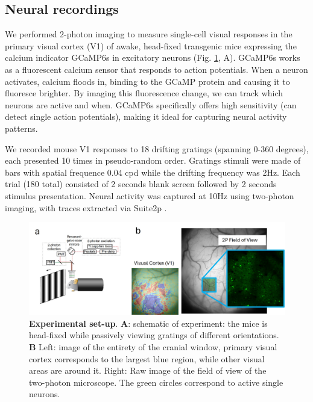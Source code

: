 \documentclass[11pt,a4paper]{article}
\begin{document}
\subsection{Neural recordings}

We performed 2-photon imaging to measure single-cell visual responses in the primary visual cortex (V1) of awake, head-fixed transgenic mice expressing the calcium indicator GCaMP6s in excitatory neurons (Fig. \ref{fig:technique.jpg}, A). GCaMP6s works as a fluorescent calcium sensor that responds to action potentials. When a neuron activates, calcium floods in, binding to the GCaMP protein and causing it to fluoresce brighter. By imaging this fluorescence change, we can track which neurons are active and when. GCaMP6s specifically offers high sensitivity (can detect single action potentials), making it ideal for capturing neural activity patterns. 

We recorded mouse V1 responses to 18 drifting gratings (spanning 0-360 degrees), each presented 10 times in pseudo-random order. Gratings stimuli were made of bars with spatial frequence 0.04 cpd while the drifting frequency was 2Hz. Each trial (180 total) consisted of 2 seconds blank screen followed by 2 seconds stimulus presentation. Neural activity was captured at 10Hz using two-photon imaging, with traces extracted via Suite2p \cite{pachitariu2016suite2p} . 

\begin{figure}[h!]
    \centering
    \includegraphics[width=\linewidth]{results/technique.jpg}
    \caption{\textbf{Experimental set-up}. \textbf{A}: schematic of experiment: the mice is head-fixed while passively viewing gratings of different orientations. \textbf{B} Left: image of the entirety of the cranial window, primary visual cortex corresponds to the largest blue region, while other visual areas are around it. Right: Raw image of the field of view of the two-photon microscope. The green circles correspond to active single neurons.} 
    \label{fig:technique.jpg}
\end{figure}
\end{document}
